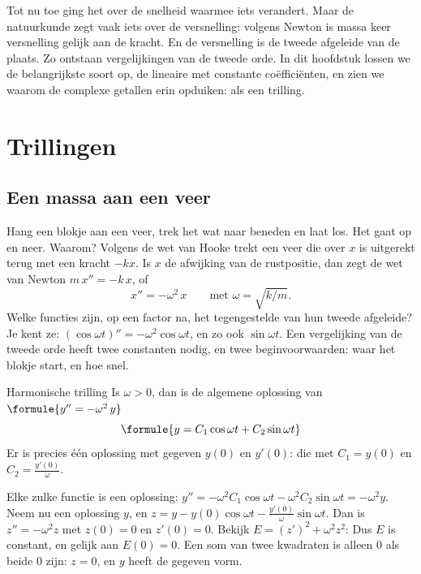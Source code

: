 Tot nu toe ging het over de snelheid waarmee iets verandert. Maar de natuurkunde zegt vaak iets over de versnelling: volgens Newton is massa keer versnelling gelijk aan de kracht. En de versnelling is de tweede afgeleide van de plaats. Zo ontstaan vergelijkingen van de tweede orde. In dit hoofdstuk lossen we de belangrijkste soort op, de lineaire met constante coëfficiënten, en zien we waarom de complexe getallen erin opduiken: als een trilling.

\begin{oefeningen}[Start]

\end{oefeningen}

\section{Trillingen}

\subsection{Een massa aan een veer}

Hang een blokje aan een veer, trek het wat naar beneden en laat los. Het gaat op en neer. Waarom? Volgens de wet van Hooke trekt een veer die over $x$ is uitgerekt terug met een kracht $-kx$. Is $x$ de afwijking van de rustpositie, dan zegt de wet van Newton $m\,x'' = -k\,x$, of
\[
x'' = -\omega^2\,x \qquad \text{met } \omega = \sqrt{k/m} .
\]
Welke functies zijn, op een factor na, het tegengestelde van hun tweede afgeleide? Je kent ze: $(\cos \omega t)'' = -\omega^2 \cos \omega t$, en zo ook $\sin \omega t$. Een vergelijking van de tweede orde heeft twee constanten nodig, en twee beginvoorwaarden: waar het blokje start, en hoe snel.

\begin{theorie}
\begin{stelling}{Harmonische trilling}
Is $\omega > 0$, dan is de algemene oplossing van $\formule{y'' = -\omega^2\,y}$
\[
\formule{y = C_1 \cos \omega t + C_2 \sin \omega t}
\]
Er is precies één oplossing met gegeven $y(0)$ en $y'(0)$: die met $C_1 = y(0)$ en $C_2 = \tfrac{y'(0)}{\omega}$.
\end{stelling}

\begin{bewijs}
Elke zulke functie is een oplossing: $y'' = -\omega^2 C_1\cos \omega t - \omega^2 C_2 \sin \omega t = -\omega^2 y$. Neem nu een oplossing $y$, en $z = y - y(0)\cos\omega t - \tfrac{y'(0)}{\omega}\sin\omega t$. Dan is $z'' = -\omega^2 z$ met $z(0) = 0$ en $z'(0) = 0$. Bekijk $E = (z')^2 + \omega^2 z^2$:
Dus $E$ is constant, en gelijk aan $E(0) = 0$. Een som van twee kwadraten is alleen 0 als beide 0 zijn: $z = 0$, en $y$ heeft de gegeven vorm.
\end{bewijs}
\end{theorie}

